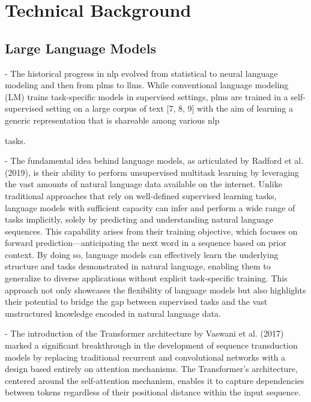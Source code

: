 \section{Technical Background}
\subsection{Large Language Models}
- The historical progress in \gls{nlp} evolved from statistical to neural language modeling and then from \glspl{plm} to \glspl{llm}. While conventional language modeling (LM) trains task-specific models in supervised settings, \glspl{plm} are trained in a self-supervised setting on a large corpus of text [7, 8, 9] with the aim of learning a generic representation that is shareable among various \gls{nlp} 

tasks.\cite{naveedComprehensiveOverviewLarge2024}

- The fundamental idea behind language models, as articulated by Radford et al. (2019), is their ability to perform unsupervised multitask learning by leveraging the vast amounts of natural language data available on the internet. Unlike traditional approaches that rely on well-defined supervised learning tasks, language models with sufficient capacity can infer and perform a wide range of tasks implicitly, solely by predicting and understanding natural language sequences. This capability arises from their training objective, which focuses on forward prediction—anticipating the next word in a sequence based on prior context. By doing so, language models can effectively learn the underlying structure and tasks demonstrated in natural language, enabling them to generalize to diverse applications without explicit task-specific training. This approach not only showcases the flexibility of language models but also highlights their potential to bridge the gap between supervised tasks and the vast unstructured knowledge encoded in natural language data.\cite{radfordLanguageModelsAre}

- The introduction of the Transformer architecture by Vaswani et al. (2017) marked a significant breakthrough in the development of sequence transduction models by replacing traditional recurrent and convolutional networks with a design based entirely on attention mechanisms. The Transformer’s architecture, centered around the self-attention mechanism, enables it to capture dependencies between tokens regardless of their positional distance within the input sequence.\cite{vaswaniAttentionAllYou2023}

